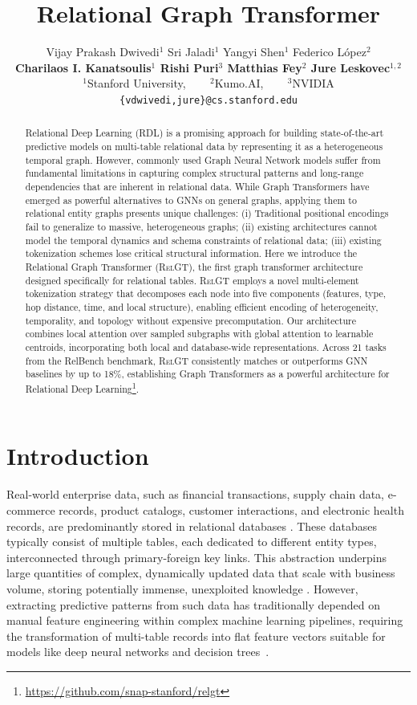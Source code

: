 \documentclass{article} %
\title{Relational Graph Transformer}
\author{
	Vijay Prakash Dwivedi$^{1}$ \hspace{5pt}
	Sri Jaladi$^{1}$ \hspace{5pt}
	Yangyi Shen$^{1}$ \hspace{5pt}
    Federico López$^{2}$
	\\
	\textbf{
		Charilaos I. Kanatsoulis$^{1}$ \hspace{5pt}
        Rishi Puri$^{3}$ \hspace{5pt}
		Matthias Fey$^{2}$ \hspace{5pt}
		Jure Leskovec$^{1,2}$%
	} 
	\\
	\hspace{2pt}$^1$Stanford University, ~~~ $^{2}$Kumo.AI, ~~~ $^{3}$NVIDIA  \\
	\hspace{2pt}\texttt{\{vdwivedi,jure\}@cs.stanford.edu}
}
\newcommand{\RelGT}{\textsc{RelGT}\xspace}
\begin{document}
\maketitle


\begin{abstract}
Relational Deep Learning (RDL) is a promising approach for building state-of-the-art predictive models on multi-table relational data by representing it as a heterogeneous temporal graph. However, commonly used Graph Neural Network models suffer from fundamental limitations in capturing complex structural patterns and long-range dependencies that are inherent in relational data. While Graph Transformers have emerged as powerful alternatives to GNNs on general graphs, applying them to relational entity graphs presents unique challenges: (i) Traditional positional encodings fail to generalize to massive, heterogeneous graphs; (ii) existing architectures cannot model the temporal dynamics and schema constraints of relational data; (iii) existing tokenization schemes lose critical structural information. 
Here we introduce the Relational Graph Transformer (\RelGT), the first graph transformer architecture designed specifically for relational tables. \RelGT employs a novel multi-element tokenization strategy that decomposes each node into five components (features, type, hop distance, time, and local structure), enabling efficient encoding of heterogeneity, temporality, and topology without expensive precomputation. Our architecture combines local attention over sampled subgraphs with global attention to learnable centroids, incorporating both local and database-wide representations. Across 21 tasks from the RelBench benchmark, \RelGT consistently matches or outperforms GNN baselines by up to 18\%, establishing Graph Transformers as a powerful architecture for Relational Deep Learning\footnote{\url{https://github.com/snap-stanford/relgt}}.
\end{abstract}


\section{Introduction}
\label{sec:intro}
Real-world enterprise data, such as financial transactions, supply chain data, e-commerce records, product catalogs, customer interactions, and electronic health records, are predominantly stored in relational databases \citep{codd1970relational}. 
These databases typically consist of multiple tables, each dedicated to different entity types, interconnected through primary-foreign key links. This abstraction underpins large quantities of complex, dynamically updated data that scale with business volume, storing potentially immense, unexploited knowledge \citep{fey2023relational}. 
However, extracting predictive patterns from such data has traditionally depended on manual feature engineering within complex machine learning pipelines, requiring the transformation of multi-table records into flat feature vectors suitable for models like deep neural networks and decision trees~\citep{chen2016xgboost}.
\end{document}
